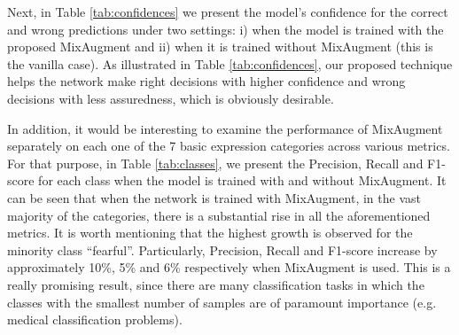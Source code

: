 \documentclass[10pt,twocolumn,letterpaper]{article}
\begin{document}
Next, in Table \ref{tab:confidences} we present the model's confidence for the correct and wrong predictions under two settings: i) when the model is trained with the proposed MixAugment and ii)  when it is trained without MixAugment (this is the vanilla case).
As illustrated in Table \ref{tab:confidences}, our proposed technique helps the network make right decisions with higher confidence and wrong decisions with less assuredness, which is obviously desirable. 



\begin{table}[h]
\caption{Prediction confidence with MixAugment and without MixAugment (i.e. vanilla case)}
\centering
\setlength{\tabcolsep}{3pt}
\label{tab:confidences}
\end{table}



In addition, it would be interesting to examine the performance of MixAugment  separately on each one of the 7 basic expression categories across various metrics. For that purpose, in Table \ref{tab:classes}, we present the Precision, Recall and F1-score for each class when the model is trained with and without MixAugment. It can be seen that when the network is trained with MixAugment, in the vast majority of the categories, there is a substantial rise in all the aforementioned metrics. It is worth mentioning that the highest growth is observed for the minority class \enquote{fearful}. Particularly, Precision, Recall and F1-score increase by approximately 10\%, 5\% and 6\% respectively when MixAugment is used. This is a really promising result, since there are many classification tasks in which the classes with the smallest number of samples are of paramount importance (e.g. medical classification problems).   
\end{document}
